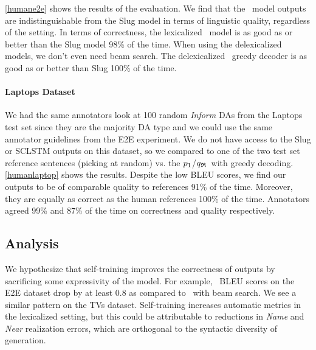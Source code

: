\autoref{humane2e} shows the results of the evaluation.
We find that the \auggen~model outputs are indistinguishable from the Slug
model in terms of linguistic quality, regardless of the setting.
In terms of correctness, the lexicalized \auggen~model is as good as or better than the Slug model 98\%
of the time. 
When using the delexicalized models, we don't even need beam search.
The delexicalized \auggen~greedy decoder is as good as or better 
than Slug 100\% of the time.

\paragraph{Laptops Dataset} We had the same annotators look at 100 random 
\textit{Inform}
DAs from the Laptops test set since they are the majority DA type and we 
could use the same annotator
guidelines from the E2E experiment. We do not have access to the Slug
or SCLSTM outputs on this dataset, so we compared to one of the two
test set reference sentences (picking at random) vs. 
the $p_1$/${q_{\mathfrak{R}} }$~with greedy decoding. \autoref{humanlaptop}
shows the results. Despite the low BLEU scores, we find our outputs
to be of comparable quality to references 91\% of the time. Moreover,
they are equally as correct as the human references 100\% of the time.
Annotators agreed 99\% and 87\% of the time on correctness and quality 
respectively.






\subsection{Analysis}

We hypothesize that self-training improves the correctness of outputs
by sacrificing some expressivity of the model. For example, 
\auggen~BLEU scores
on the E2E dataset drop by at least 0.8 as compared to \basegen~with beam
search. We see a similar pattern on the TVs dataset. Self-training
increases automatic metrics in the lexicalized setting, but this could 
be attributable to reductions  in \textit{Name} and \textit{Near}
realization errors, which are orthogonal to the 
syntactic diversity of generation.

